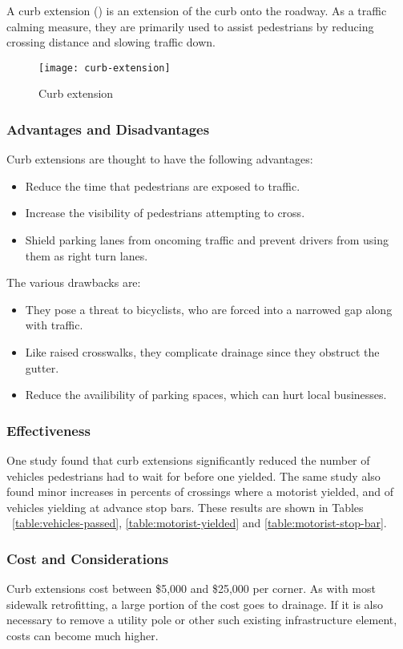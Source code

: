 A curb extension () is an extension of the curb onto the roadway. As a traffic calming measure, they are primarily used to assist pedestrians by reducing crossing distance and slowing traffic down.

\begin{figure}[h]
\centering
\texttt{[image: curb-extension]}
\caption{Curb extension}\label{fig:curb-extension}
\end{figure}

\subsubsection{Advantages and Disadvantages}

Curb extensions are thought to have the following advantages:\begin{itemize}
\item Reduce the time that pedestrians are exposed to traffic.
\item Increase the visibility of pedestrians attempting to cross.
\item Shield parking lanes from oncoming traffic and prevent drivers from using them as right turn lanes.
\end{itemize}

The various drawbacks are:\begin{itemize}
\item They pose a threat to bicyclists, who are forced into a narrowed gap along with traffic.
\item Like raised crosswalks, they complicate drainage since they obstruct the gutter.
\item Reduce the availibility of parking spaces, which can hurt local businesses.
\end{itemize}

\subsubsection{Effectiveness}

One study \cite{randal05} found that curb extensions significantly reduced the number of vehicles pedestrians had to wait for before one yielded. The same study also found minor increases in percents of crossings where a motorist yielded, and of vehicles yielding at advance stop bars. These results are shown in Tables ~\ref{table:vehicles-passed}, \ref{table:motorist-yielded} and \ref{table:motorist-stop-bar}.

\subsubsection{Cost and Considerations}

Curb extensions cost between \$5,000 and \$25,000 per corner\cite{walking-info-enhancements}. As with most sidewalk retrofitting, a large portion of the cost goes to drainage. If it is also necessary to remove a utility pole or other such existing infrastructure element, costs can become much higher.



